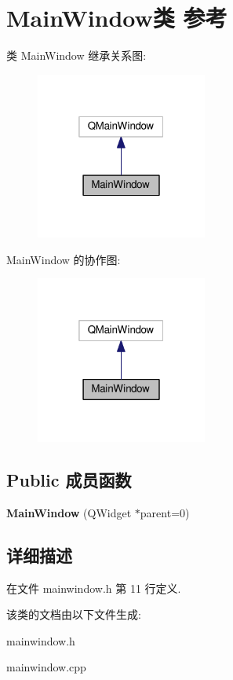 \section{Main\+Window类 参考}
\label{class_main_window}


类 Main\+Window 继承关系图\+:\nopagebreak
\begin{figure}[H]
\begin{center}
\leavevmode
\includegraphics[width=160pt]{class_main_window__inherit__graph}
\end{center}
\end{figure}


Main\+Window 的协作图\+:\nopagebreak
\begin{figure}[H]
\begin{center}
\leavevmode
\includegraphics[width=160pt]{class_main_window__coll__graph}
\end{center}
\end{figure}
\subsection*{Public 成员函数}
\begin{DoxyCompactItemize}
\item 
{\bfseries Main\+Window} (Q\+Widget $\ast$parent=0)\label{class_main_window_a8b244be8b7b7db1b08de2a2acb9409db}

\end{DoxyCompactItemize}


\subsection{详细描述}


在文件 mainwindow.\+h 第 11 行定义.



该类的文档由以下文件生成\+:\begin{DoxyCompactItemize}
\item 
mainwindow.\+h\item 
mainwindow.\+cpp\end{DoxyCompactItemize}
